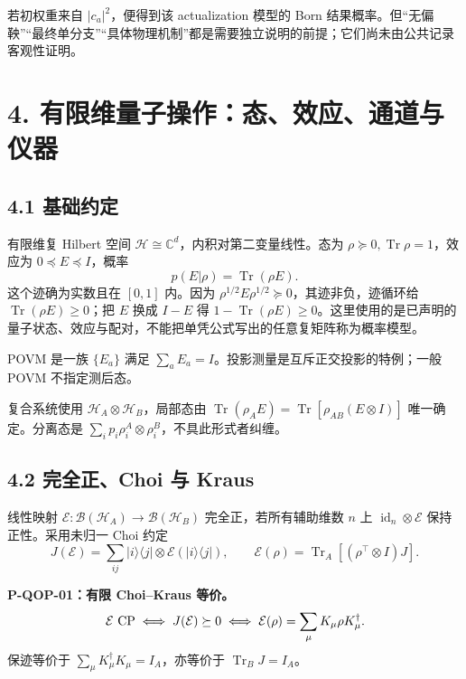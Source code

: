 \documentclass[
  11pt,
  oneside]{book}
\begin{document}
若初权重来自 \(|c_a|^2\)，便得到该 actualization 模型的 Born
结果概率。但``无偏鞅''``最终单分支''``具体物理机制''都是需要独立说明的前提；它们尚未由公共记录客观性证明。

\hypertarget{ch-4}{%
\chapter{4. 有限维量子操作：态、效应、通道与仪器}\label{ch-4}}

\hypertarget{ux57faux7840ux7ea6ux5b9a}{%
\section{4.1 基础约定}\label{ux57faux7840ux7ea6ux5b9a}}

有限维复 Hilbert 空间
\(\mathcal H\cong\mathbb C^d\)，内积对第二变量线性。态为
\(\rho\succeq0,\operatorname{Tr}\rho=1\)，效应为
\(0\preceq E\preceq I\)，概率 \[
p(E|\rho)=\operatorname{Tr}(\rho E).
\] 这个迹确为实数且在 \([0,1]\) 内。因为
\(\rho^{1/2}E\rho^{1/2}\succeq0\)，其迹非负，迹循环给
\(\operatorname{Tr}(\rho E)\ge0\)；把 \(E\) 换成 \(I-E\) 得
\(1-\operatorname{Tr}(\rho E)\ge0\)。这里使用的是已声明的量子状态、效应与配对，不能把单凭公式写出的任意复矩阵称为概率模型。

POVM 是一族 \(\{E_a\}\) 满足
\(\sum_aE_a=I\)。投影测量是互斥正交投影的特例；一般 POVM 不指定测后态。

复合系统使用 \(\mathcal H_A\otimes\mathcal H_B\)，局部态由
\(\operatorname{Tr}(\rho_AE)=\operatorname{Tr}[\rho_{AB}(E\otimes I)]\)
唯一确定。分离态是
\(\sum_i p_i\rho_i^A\otimes\rho_i^B\)，不具此形式者纠缠。

\hypertarget{ux5b8cux5168ux6b63choi-ux4e0e-kraus}{%
\section{4.2 完全正、Choi 与
Kraus}\label{ux5b8cux5168ux6b63choi-ux4e0e-kraus}}

线性映射
\(\mathcal E:\mathcal B(\mathcal H_A)\to\mathcal B(\mathcal H_B)\)
完全正，若所有辅助维数 \(n\) 上 \(\operatorname{id}_n\otimes\mathcal E\)
保持正性。采用未归一 Choi 约定 \[
J(\mathcal E)=\sum_{ij}|i\rangle\langle j|\otimes
\mathcal E(|i\rangle\langle j|),\qquad
\mathcal E(\rho)=\operatorname{Tr}_A[(\rho^\top\otimes I)J].
\]

\protect\hypertarget{p-qop-01}{}{}

\textbf{P-QOP-01：有限 Choi--Kraus 等价。} \[
\mathcal E\ {\rm CP}\iff J(\mathcal E)\succeq0
\iff\mathcal E(\rho)=\sum_\mu K_\mu\rho K_\mu^\dagger.
\] 保迹等价于 \(\sum_\mu K_\mu^\dagger K_\mu=I_A\)，亦等价于
\(\operatorname{Tr}_B J=I_A\)。
\end{document}
